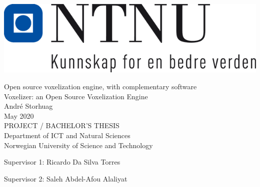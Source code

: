  
\thispagestyle{empty}
\includegraphics[scale=0.4]{fig/logo.png}
\mbox{}\\[6pc]
\begin{center}
\Huge{Open source voxelization engine, with complementary software}\\[2pc]
\Huge{Voxelizer: an Open Source Voxelization Engine}\\[2pc]
 
\Large{André Storhuag}\\[1pc]
\large{May 2020}\\[2pc]
 
PROJECT / BACHELOR'S THESIS\\
Department of ICT and Natural Sciences\\
Norwegian University of Science and Technology
\end{center}
\vfill
 
\noindent Supervisor 1: Ricardo Da Silva Torres

\noindent Supervisor 2: Saleh Abdel-Afou Alaliyat
 